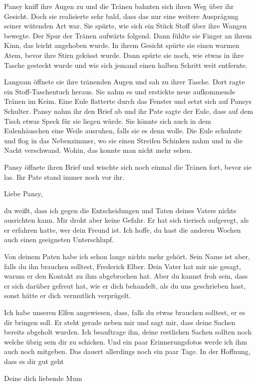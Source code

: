 Pansy kniff ihre Augen zu und die Tränen bahnten sich ihren Weg über ihr Gesicht.  Doch sie realisierte sehr bald, dass das nur eine weitere Ausprägung seiner wütenden Art war. Sie spürte, wie sich ein Stück Stoff über ihre Wangen bewegte. Der Spur der Tränen aufwärts folgend. Dann fühlte sie Finger an ihrem Kinn, das leicht angehoben wurde. In ihrem Gesicht spürte sie einen warmen Atem, bevor ihre Stirn geküsst wurde. Dann spürte sie noch, wie etwas in ihre Tasche gesteckt wurde und wie sich jemand einen halben Schritt weit entfernte.

Langsam öffnete sie ihre tränenden Augen und sah zu ihrer Tasche. Dort ragte ein Stoff-Taschentuch heraus. Sie nahm es und erstickte neue aufkommende Tränen im Keim. Eine Eule flatterte durch das Fenster und setzt sich auf Pansys Schulter. Pansy nahm ihr den Brief ab und ihr Pate sagte der Eule, dass auf dem Tisch etwas Speck für sie liegen würde. Sie könnte sich auch in dem Eulenhäuschen eine Weile ausruhen, falls sie es denn wolle. Die Eule schuhute und flog in das Nebenzimmer, wo sie einen Streifen Schinken nahm und in die Nacht verschwand. Wohin, das konnte man nicht mehr sehen.

Pansy öffnete ihren Brief und wischte sich noch einmal die Tränen fort, bevor sie las. Ihr Pate stand immer noch vor ihr.

\begin{brief}
Liebe Pansy,

du weißt, dass ich gegen die Entscheidungen und Taten deines Vaters nichts ausrichten kann. Mir droht aber keine Gefahr. Er hat sich tierisch aufgeregt, als er erfahren hatte, wer dein Freund ist. Ich hoffe, du hast die anderen Wochen auch einen geeigneten Unterschlupf.

Von deinem Paten habe ich schon lange nichts mehr gehört. Sein Name ist aber, falls du ihn brauchen solltest, Frederick Elber. Dein Vater hat mir nie gesagt, warum er den Kontakt zu ihm abgebrochen hat. Aber du kannst froh sein, dass er sich darüber gefreut hat, wie er dich behandelt, als du uns geschrieben hast, sonst hätte er dich vermutlich verprügelt.

Ich habe unseren Elfen angewiesen, dass, falls du etwas brauchen solltest, er es dir bringen soll. \gst Er steht gerade neben mir und sagt mir, dass deine Sachen bereits abgeholt wurden. Ich beauftrage ihn, deine restlichen Sachen \gst sollten noch welche übrig sein \gst dir zu schicken. Und ein paar Erinnerungsfotos werde ich ihm auch noch mitgeben. Das dauert allerdings noch ein paar Tage.
\signumspace
In der Hoffnung, dass es dir gut geht\gst

Deine dich liebende Mum
\end{brief}

